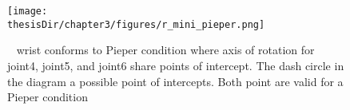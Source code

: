 \begin{figure}
  \centering
  \captionsetup{justification=centering}
  \texttt{[image: \\thesisDir/chapter3/figures/r\_mini\_pieper.png]}
  \caption{\rimini~ wrist conforms to Pieper condition where axis of rotation 
  for joint4, joint5, and joint6 share points of intercept. The dash circle in the 
  diagram a possible point of intercepts. Both point are valid for a Pieper condition}
  \label{fig:r_mini_pieper}
\end{figure}

